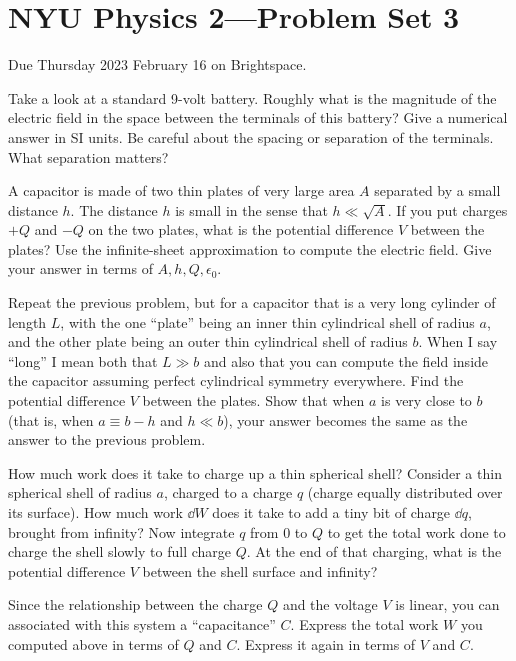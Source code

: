 \documentclass[12pt]{article}
\begin{document}
\section*{NYU Physics 2---Problem Set 3}

Due Thursday 2023 February 16 on Brightspace.

\startproblem%
Take a look at a standard 9-volt battery.
Roughly what is the magnitude of the electric field in the space
between the terminals of this battery? Give a numerical answer in
SI units.
Be careful about the spacing or separation of the terminals.
What separation matters?

\startproblem%
A capacitor is made of two thin plates of very large area $A$
separated by a small distance $h$. The distance $h$ is small in the sense
that $h\ll \sqrt{A}$. If you put charges $+Q$ and $-Q$ on the
two plates, what is the potential difference $V$ between the plates?
Use the infinite-sheet approximation to compute the electric field.
Give your answer in terms of $A, h, Q, \epsilon_0$.

\startproblem%
Repeat the previous problem, but for a capacitor that is a very long
cylinder of length $L$, with the one ``plate'' being an inner thin
cylindrical shell of radius $a$, and the other plate being an outer
thin cylindrical shell of radius $b$. When I say ``long'' I mean both that
$L\gg b$ and also that you
can compute the field inside the capacitor assuming perfect
cylindrical symmetry everywhere. Find the potential difference $V$
between the plates. Show that when $a$ is very close to $b$ (that
is, when $a \equiv b - h$ and $h \ll b$), your answer becomes the same
as the answer to the previous problem.

\startproblem%
How much work does it take to charge up a thin spherical shell?
Consider a thin spherical shell of radius $a$, charged to a charge
$q$ (charge equally distributed over its surface). How much work
$\dd W$ does it take to add a tiny bit of charge $\dd q$, brought
from infinity? Now integrate $q$ from $0$ to $Q$ to get the total
work done to charge the shell slowly to full charge $Q$. At the
end of that charging, what is the potential difference $V$ between
the shell surface and infinity?

Since the relationship between the charge $Q$ and the voltage $V$ is
linear, you can associated with this system a ``capacitance''
$C$. Express the total work $W$ you computed above in terms of $Q$ and
$C$. Express it again in terms of $V$ and $C$.
\end{document}
